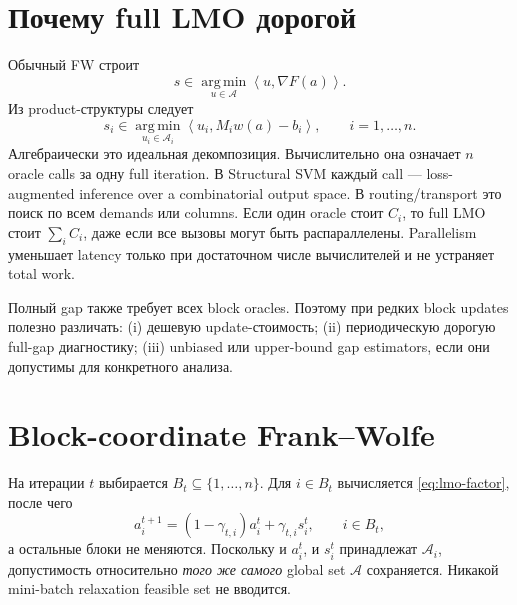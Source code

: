\documentclass[11pt,a4paper]{article}
\newcommand{\A}{\mathcal{A}}
\newcommand{\ip}[2]{\left\langle #1,#2\right\rangle}
\newcommand{\argmin}{\operatorname*{arg\,min}}
\begin{document}
\section{Почему full LMO дорогой}

Обычный FW строит \citep{jaggi2013}
\begin{equation}
  \label{eq:full-lmo}
  s\in\argmin_{u\in\A}\ip{u}{\nabla F(a)}.
\end{equation}
Из product-структуры следует
\begin{equation}
  \label{eq:lmo-factor}
  s_i\in\argmin_{u_i\in\A_i}
  \ip{u_i}{M_iw(a)-b_i},\qquad i=1,\ldots,n.
\end{equation}
Алгебраически это идеальная декомпозиция. Вычислительно она означает \(n\) oracle calls за одну full iteration. В Structural SVM каждый call --- loss-augmented inference over a combinatorial output space. В routing/transport это поиск по всем demands или columns. Если один oracle стоит \(C_i\), то full LMO стоит \(\sum_i C_i\), даже если все вызовы могут быть распараллелены. Parallelism уменьшает latency только при достаточном числе вычислителей и не устраняет total work.

Полный gap также требует всех block oracles. Поэтому при редких block updates полезно различать: (i) дешевую update-стоимость; (ii) периодическую дорогую full-gap диагностику; (iii) unbiased или upper-bound gap estimators, если они допустимы для конкретного анализа.

\section{Block-coordinate Frank--Wolfe}

На итерации \(t\) выбирается \(B_t\subseteq\{1,\ldots,n\}\). Для \(i\in B_t\) вычисляется \eqref{eq:lmo-factor}, после чего
\begin{equation}
  \label{eq:block-update}
  a_i^{t+1}=(1-\gamma_{t,i})a_i^t+\gamma_{t,i}s_i^t,
  \qquad i\in B_t,
\end{equation}
а остальные блоки не меняются. Поскольку и \(a_i^t\), и \(s_i^t\) принадлежат \(\A_i\), допустимость относительно \emph{того же самого} global set \(\A\) сохраняется. Никакой mini-batch relaxation feasible set не вводится.

\begin{center}
\end{center}
\end{document}

